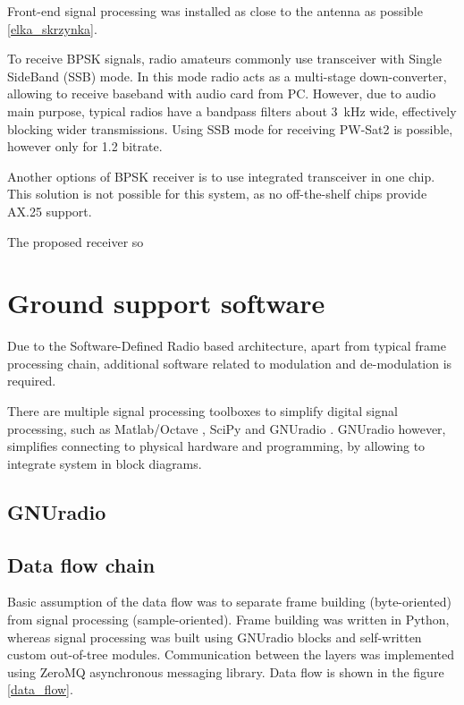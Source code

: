 Front-end signal processing was installed as close to the antenna as possible \ref{elka_skrzynka}.




To receive BPSK signals, radio amateurs commonly use transceiver with Single SideBand  (SSB) mode. In this mode radio acts as a multi-stage down-converter, allowing to receive baseband with audio card from PC. However, due to audio main purpose, typical radios have a bandpass filters about \SI{3}{\kHz} wide, effectively blocking wider transmissions. Using SSB mode for receiving PW-Sat2 is possible, however only for \SI{1.2}{\kbps} bitrate.

Another options of BPSK receiver is to use integrated transceiver in one chip. This solution is not possible for this system, as no off-the-shelf chips provide AX.25 support.

The proposed receiver so



\chapter{Ground support software}
Due to the Software-Defined Radio based architecture, apart from typical frame processing chain, additional software related to modulation and de-modulation is required.

There are multiple signal processing toolboxes to simplify digital signal processing, such as Matlab/Octave \cite{Matlab}, SciPy \cite{Scipy} and GNUradio \cite{Gnuradio}. GNUradio however, simplifies connecting to physical hardware and programming, by allowing to integrate system in block diagrams.

\section{GNUradio}

\section{Data flow chain}
Basic assumption of the data flow was to separate frame building (byte-oriented) from signal processing (sample-oriented). Frame building was written in Python, whereas signal processing was built using GNUradio blocks and self-written custom out-of-tree modules. Communication between the layers was implemented using ZeroMQ asynchronous messaging library. Data flow is shown in the figure \ref{data_flow}.

